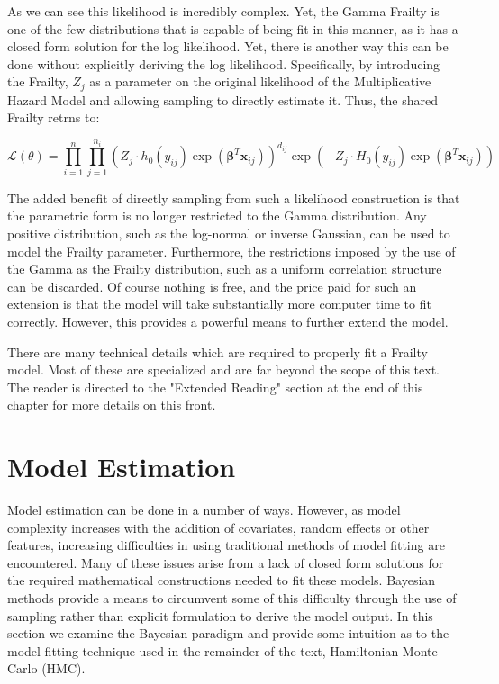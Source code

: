 As we can see this likelihood is incredibly complex. Yet, the Gamma Frailty is one of the few distributions that is capable of being fit in this manner, as it has a closed form solution for the log likelihood. Yet, there is another way this can be done without explicitly deriving the log likelihood. Specifically, by introducing the Frailty, $Z_j$ as a parameter on the original likelihood of the Multiplicative Hazard Model and allowing sampling to directly estimate it. Thus, the shared Frailty retrns to:

$$ \mathcal {L}(\theta) = \prod^n_{i=1} \prod^{n_i}_{j=1} \left (Z_j \cdot h_0(y_{ij}) \exp(\boldsymbol\beta^T \textbf{x}_{ij})  \right )^{d_{ij}} \exp(-Z_j \cdot H_0(y_{ij}) \exp(\boldsymbol\beta^T \textbf{x}_{ij}) )$$

The added benefit of directly sampling from such a likelihood construction is that the parametric form is no longer restricted to the Gamma distribution. Any positive distribution, such as the log-normal or inverse Gaussian, can be used to model the Frailty parameter. Furthermore, the restrictions imposed by the use of the Gamma as the Frailty distribution, such as a uniform correlation structure can be discarded. Of course nothing is free, and the price paid for such an extension is that the model will take substantially more computer time to fit correctly. However, this provides a powerful means to further extend the model.

There are many technical details which are required to properly fit a Frailty model. Most of these are specialized and are far beyond the scope of this text. The reader is directed to the "Extended Reading" section at the end of this chapter for more details on this front.




\section*{Model Estimation}


Model estimation can be done in a number of ways. However, as model complexity increases with the addition of covariates, random effects or other features, increasing difficulties in using traditional methods of model fitting are encountered. Many of these issues arise from a lack of closed form solutions for the required mathematical constructions needed to fit these models. Bayesian methods provide a means to circumvent some of this difficulty through the use of sampling rather than explicit formulation to derive the model output. In this section we examine the Bayesian paradigm and provide some intuition as to the model fitting technique used in the remainder of the text, Hamiltonian Monte Carlo (HMC).

